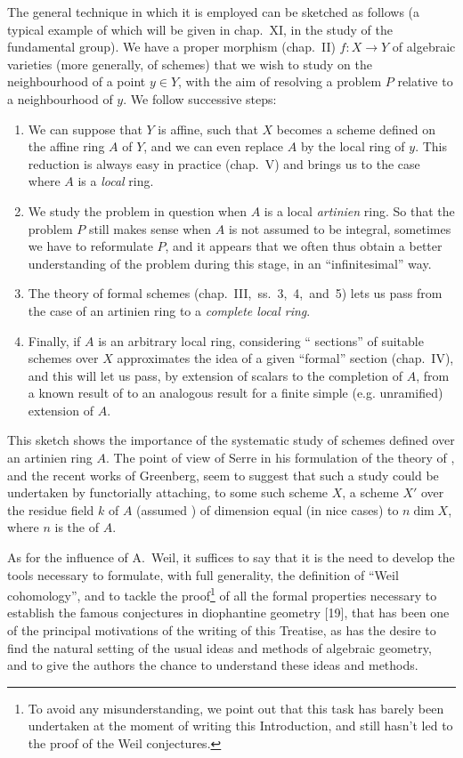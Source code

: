 \documentclass[../main.tex]{subfiles}
\begin{document}
The general technique in which it is employed can be sketched as follows (a typical example of which will be given in chap.~XI, in the study of the fundamental group).
We have a proper morphism (chap.~II) $f\colon X\to Y$ of algebraic varieties (more generally, of schemes) that we wish to study on the neighbourhood of a point $y\in Y$, with the aim of resolving a problem $P$ relative to a neighbourhood of $y$.
We follow successive steps:
\begin{enumerate}
    \item We can suppose that $Y$ is affine, such that $X$ becomes a scheme defined on the affine ring $A$ of $Y$, and we can even replace $A$ by the local ring of $y$.
    This reduction is always easy in practice (chap.~V) and brings us to the case where $A$ is a \emph{local} ring.
    \item We study the problem in question when $A$ is a local \emph{artinien} ring.
    So that the problem $P$ still makes sense when $A$ is not assumed to be integral, sometimes we have to reformulate $P$, and it appears that we often thus obtain a better understanding of the problem during this stage, in an ``infinitesimal'' way.
    \item The theory of formal schemes (chap.~III,~ss.~3,~4,~and~5) lets us pass from the case of an artinien ring to a \emph{complete local ring}.
    \item Finally, if $A$ is an arbitrary local ring, considering `` sections'' of suitable schemes over $X$ approximates the idea of a given ``formal'' section (chap.~IV), and this will let us pass, by extension of scalars to the completion of $A$, from a known result of \completelyunsure to an analogous result for a finite simple (e.g. unramified) extension of $A$.
\end{enumerate}

This sketch shows the importance of the systematic study of schemes defined over an artinien ring $A$.
The point of view of Serre in his formulation of the theory of , and the recent works of Greenberg, seem to suggest that such a study could be undertaken by functorially attaching, to some such scheme $X$, a scheme $X'$ over the residue field $k$ of $A$ (assumed ) of dimension equal (in nice cases) to $n\dim X$, where $n$ is the  of $A$.

As for the influence of A.~Weil, it suffices to say that it is the need to develop the tools necessary to formulate, with full generality, the definition of ``Weil cohomology'', and to tackle the proof\footnote[1]{To avoid any misunderstanding, we point out that this task has barely been undertaken at the moment of writing this Introduction, and still hasn't led to the proof of the Weil conjectures.} of all the formal properties necessary to establish the famous conjectures in diophantine geometry [19], that has been one of the principal motivations of the writing of this Treatise, as has the desire to find the natural setting of the usual ideas and methods of algebraic geometry, and to give the authors the chance to understand these ideas and methods.
\end{document}

